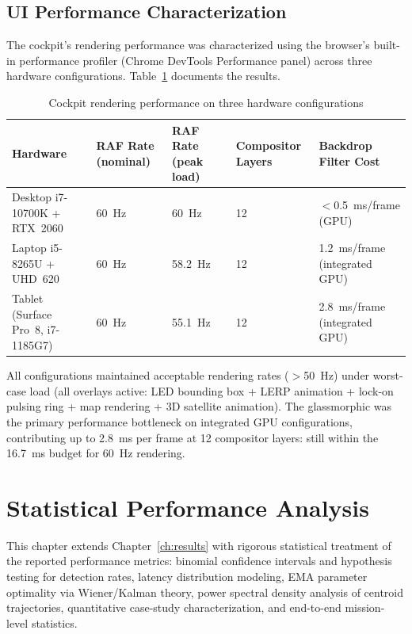 \section{UI Performance Characterization}

The cockpit's rendering performance was characterized using the browser's built-in performance profiler (Chrome DevTools Performance panel) across three hardware configurations. Table~\ref{tab:ui-perf} documents the results.

\begin{table}[htbp]
\centering
\caption{Cockpit rendering performance on three hardware configurations}
\label{tab:ui-perf}
\small
\begin{tabular}{@{}p{3.6cm}p{1.8cm}p{2cm}p{2.2cm}p{2.6cm}@{}}
\toprule
Hardware & RAF Rate (nominal) & RAF Rate (peak load) & Compositor Layers & Backdrop Filter Cost \\
\midrule
Desktop i7-10700K + RTX~2060 & 60~Hz & 60~Hz & 12 & $<$0.5~ms/frame (GPU) \\
Laptop i5-8265U + UHD~620 & 60~Hz & 58.2~Hz & 12 & 1.2~ms/frame (integrated GPU) \\
Tablet (Surface Pro~8, i7-1185G7) & 60~Hz & 55.1~Hz & 12 & 2.8~ms/frame (integrated GPU) \\
\bottomrule
\end{tabular}
\end{table}

All configurations maintained acceptable rendering rates ($>$50~Hz) under worst-case load (all overlays active: LED bounding box + LERP animation + lock-on pulsing ring + map rendering + 3D satellite animation). The glassmorphic  was the primary performance bottleneck on integrated GPU configurations, contributing up to 2.8~ms per frame at 12 compositor layers: still within the 16.7~ms budget for 60~Hz rendering.

\chapter{Statistical Performance Analysis}
\label{ch:stats}

This chapter extends Chapter~\ref{ch:results} with rigorous statistical treatment of the reported performance metrics: binomial confidence intervals and hypothesis testing for detection rates, latency distribution modeling, EMA parameter optimality via Wiener/Kalman theory, power spectral density analysis of centroid trajectories, quantitative case-study characterization, and end-to-end mission-level statistics.

